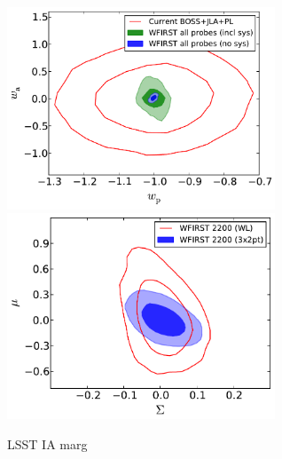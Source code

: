 \begin{figure}
\includegraphics[width=8cm]{Plots/forecasts/WFIRST_multi_probe.pdf}
\includegraphics[width=8cm]{Plots/forecasts/WFIRST_shear_vs_MP.pdf}
\caption{LSST IA marg}
         \label{fi:lsst1}
\end{figure}
